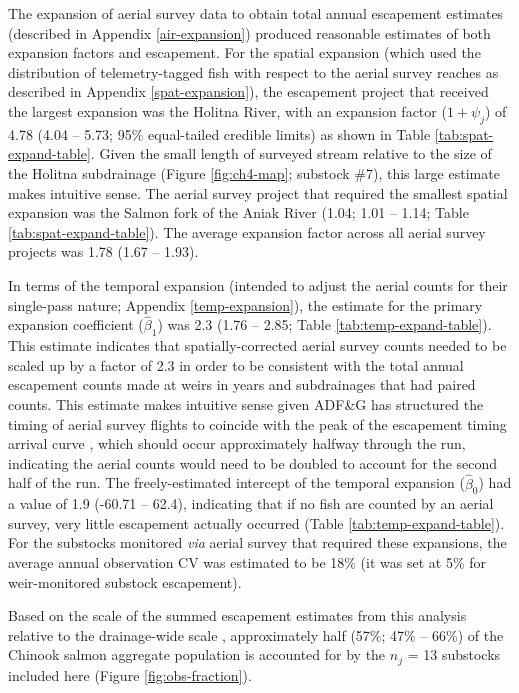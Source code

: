 \documentclass[12pt,]{book}
\theoremstyle{definition}
\theoremstyle{definition}
\theoremstyle{definition}
\theoremstyle{remark}
\begin{document}
\noindent
The expansion of aerial survey data to obtain total annual escapement
estimates (described in Appendix \ref{air-expansion}) produced
reasonable estimates of both expansion factors and escapement. For the
spatial expansion (which used the distribution of telemetry-tagged fish
with respect to the aerial survey reaches as described in Appendix
\ref{spat-expansion}), the escapement project that received the largest
expansion was the Holitna River, with an expansion factor
(\(1 + \psi_j\)) of 4.78 (4.04 -- 5.73; 95\% equal-tailed credible
limits) as shown in Table \ref{tab:spat-expand-table}. Given the small
length of surveyed stream relative to the size of the Holitna
subdrainage (Figure \ref{fig:ch4-map}; substock \#7), this large
estimate makes intuitive sense. The aerial survey project that required
the smallest spatial expansion was the Salmon fork of the Aniak River
(1.04; 1.01 -- 1.14; Table \ref{tab:spat-expand-table}). The average
expansion factor across all aerial survey projects was 1.78 (1.67 --
1.93).

In terms of the temporal expansion (intended to adjust the aerial counts
for their single-pass nature; Appendix \ref{temp-expansion}), the
estimate for the primary expansion coefficient (\(\hat{\beta}_1\)) was
2.3 (1.76 -- 2.85; Table \ref{tab:temp-expand-table}). This estimate
indicates that spatially-corrected aerial survey counts needed to be
scaled up by a factor of 2.3 in order to be consistent with the total
annual escapement counts made at weirs in years and subdrainages that
had paired counts. This estimate makes intuitive sense given ADF\&G has
structured the timing of aerial survey flights to coincide with the peak
of the escapement timing arrival curve \citep{head-liller-2017}, which
should occur approximately halfway through the run, indicating the
aerial counts would need to be doubled to account for the second half of
the run. The freely-estimated intercept of the temporal expansion
(\(\hat{\beta}_0\)) had a value of 1.9 (-60.71 -- 62.4), indicating that
if no fish are counted by an aerial survey, very little escapement
actually occurred (Table \ref{tab:temp-expand-table}). For the substocks
monitored \emph{via} aerial survey that required these expansions, the
average annual observation CV was estimated to be 18\% (it was set at
5\% for weir-monitored substock escapement).

Based on the scale of the summed escapement estimates from this analysis
relative to the drainage-wide scale \citep[which includes monitored and
unmonitored substocks;][]{liller-etal-2018}, approximately half (57\%;
47\% -- 66\%) of the Chinook salmon aggregate population is accounted
for by the \(n_j\) = 13 substocks included here (Figure
\ref{fig:obs-fraction}).
\end{document}
